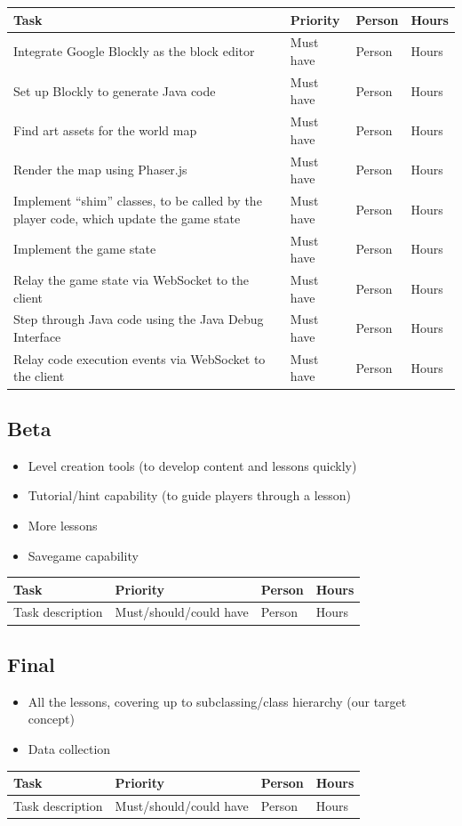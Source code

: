 \documentclass[12pt,notitlepage]{article}
\begin{document}
\begin{tabu}{Xlll}
\toprule
Task & Priority & Person & Hours \\
\midrule
Integrate Google Blockly as the block editor & Must have & Person & Hours \\
Set up Blockly to generate Java code & Must have & Person & Hours \\
Find art assets for the world map & Must have & Person & Hours \\
Render the map using Phaser.js & Must have & Person & Hours \\
Implement ``shim'' classes, to be called by the player code, which update the game state & Must have & Person & Hours \\
Implement the game state & Must have & Person & Hours \\
Relay the game state via WebSocket to the client & Must have & Person & Hours \\
Step through Java code using the Java Debug Interface & Must have & Person & Hours \\
Relay code execution events via WebSocket to the client & Must have & Person & Hours \\
\bottomrule
\end{tabu}

\subsection{Beta}

\begin{itemize}
\item Level creation tools (to develop content and lessons quickly)
\item Tutorial/hint capability (to guide players through a lesson)
\item More lessons
\item Savegame capability
\end{itemize}

\begin{tabu}{lXXl}
\toprule
Task & Priority & Person & Hours \\
\midrule
Task description & Must/should/could have & Person & Hours \\
\bottomrule
\end{tabu}

\subsection{Final}
\begin{itemize}
\item All the lessons, covering up to subclassing/class hierarchy (our
  target concept)
\item Data collection
\end{itemize}

\begin{tabu}{lXXl}
\toprule
Task & Priority & Person & Hours \\
\midrule
Task description & Must/should/could have & Person & Hours \\
\bottomrule
\end{tabu}
\end{document}
